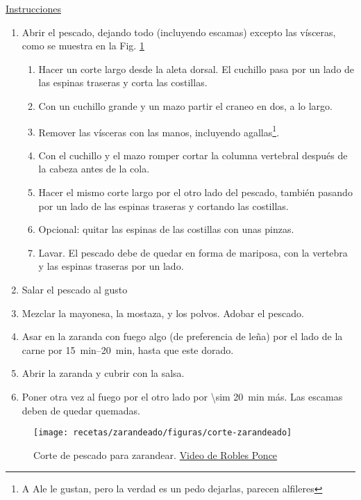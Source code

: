 \underline{Instrucciones}
\begin{enumerate}
\item Abrir el pescado, dejando todo (incluyendo escamas) excepto las vísceras, como se muestra en la Fig. \ref{fig:corte-zarandeado}
\begin{enumerate}
\item Hacer un corte largo desde la aleta dorsal. El cuchillo pasa por un lado de las espinas traseras y corta las costillas.
\item Con un cuchillo grande y un mazo partir el craneo en dos, a lo largo.
\item Remover las vísceras con las manos, incluyendo agallas\footnote{A Ale le gustan, pero la verdad es un pedo dejarlas, parecen alfileres}.
\item Con el cuchillo y el mazo romper cortar la columna vertebral después de la cabeza antes de la cola.
\item Hacer el mismo corte largo por el otro lado del pescado, también pasando por un lado de las espinas traseras y cortando las costillas.
\item Opcional: quitar las espinas de las costillas con unas pinzas.
\item Lavar. El pescado debe de quedar en forma de mariposa, con la vertebra y las espinas traseras por un lado.
\end{enumerate}
\item Salar el pescado al gusto
\item Mezclar la mayonesa, la mostaza, y los polvos. Adobar el pescado.
\item Asar en la zaranda con fuego algo (de preferencia de leña) por el lado de la carne por \SIrange{15}{20}{min}, hasta que este dorado.
\item Abrir la zaranda y cubrir con la salsa.
\item Poner otra vez al fuego por el otro lado por \SI{\sim 20}{min} más. Las escamas deben de quedar quemadas.
\end{enumerate}

\begin{figure}
\texttt{[image: recetas/zarandeado/figuras/corte-zarandeado]}
\caption{Corte de pescado para zarandear. \href{https://www.youtube.com/watch?v=_OmdFQWyWRc}{Video de Robles Ponce}}
\label{fig:corte-zarandeado}
\end{figure}